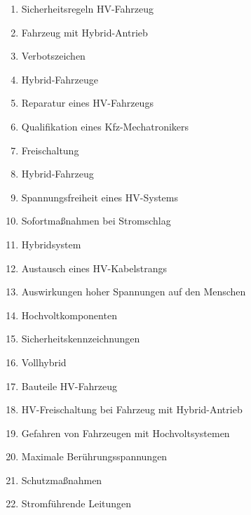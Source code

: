 \begin{enumerate}
\item
  Sicherheitsregeln HV-Fahrzeug\\
\item
  Fahrzeug mit Hybrid-Antrieb\\
\item
  Verbotszeichen\\
\item
  Hybrid-Fahrzeuge\\
\item
  Reparatur eines HV-Fahrzeugs\\
\item
  Qualifikation eines Kfz-Mechatronikers\\
\item
  Freischaltung\\
\item
  Hybrid-Fahrzeug\\
\item
  Spannungsfreiheit eines HV-Systems\\
\item
  Sofortmaßnahmen bei Stromschlag\\
\item
  Hybridsystem\\
\item
  Austausch eines HV-Kabelstrangs\\
\item
  Auswirkungen hoher Spannungen auf den Menschen\\
\item
  Hochvoltkomponenten\\
\item
  Sicherheitskennzeichnungen\\
\item
  Vollhybrid\\
\item
  Bauteile HV-Fahrzeug\\
\item
  HV-Freischaltung bei Fahrzeug mit Hybrid-Antrieb\\
\item
  Gefahren von Fahrzeugen mit Hochvoltsystemen\\
\item
  Maximale Berührungsspannungen\\
\item
  Schutzmaßnahmen\\
\item
  Stromführende Leitungen\\

\end{enumerate}
